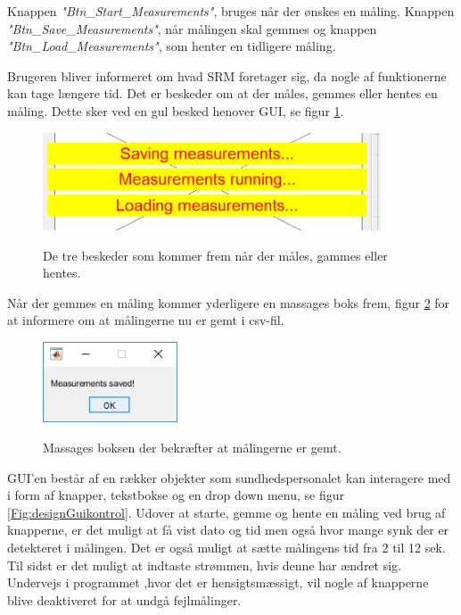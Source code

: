 Knappen \textit{"Btn\_Start\_Measurements"}, bruges når der ønskes en måling. Knappen \textit{"Btn\_Save\_Measurements"}, når målingen skal gemmes og knappen \textit{"Btn\_Load\_Measurements"}, som henter en tidligere måling.

Brugeren bliver informeret om hvad SRM foretager sig, da nogle af funktionerne kan tage længere tid. Det er beskeder om at der måles, gemmes eller hentes en måling. Dette sker ved en gul besked henover GUI, se figur \ref{Fig:designmessageboks1}.
 
 \begin{figure}[H]
\centering
{\includegraphics[width=10cm]
{Figure/designmessageboks1}}
\caption{De tre beskeder som kommer frem når der måles, gammes eller hentes.}
\label{Fig:designmessageboks1}
\end{figure} 
 
 
Når der gemmes en måling kommer yderligere en massages boks frem, figur \ref{Fig:designmessageboks3} for at informere om at målingerne nu er gemt i csv-fil.

\begin{figure}[H]
\centering
{\includegraphics[width=4cm]
{Figure/designmessageboks3}}
\caption{Massages boksen der bekræfter at målingerne er gemt.}
\label{Fig:designmessageboks3}
\end{figure} 

GUI'en består af en rækker objekter som sundhedspersonalet kan interagere med i form af knapper, tekstbokse og en drop down menu, se figur \ref{Fig:designGuikontrol}. Udover at starte, gemme og hente en måling ved brug af knapperne, er det muligt at få vist dato og tid men også hvor mange synk der er 
detekteret i målingen. Det er også muligt at sætte målingens tid fra 2 til 12 sek. Til sidst er det muligt at indtaste strømmen, hvis denne har ændret sig. Undervejs i programmet ,hvor det er hensigtsmæssigt, vil nogle af knapperne blive deaktiveret for at undgå fejlmålinger. 


